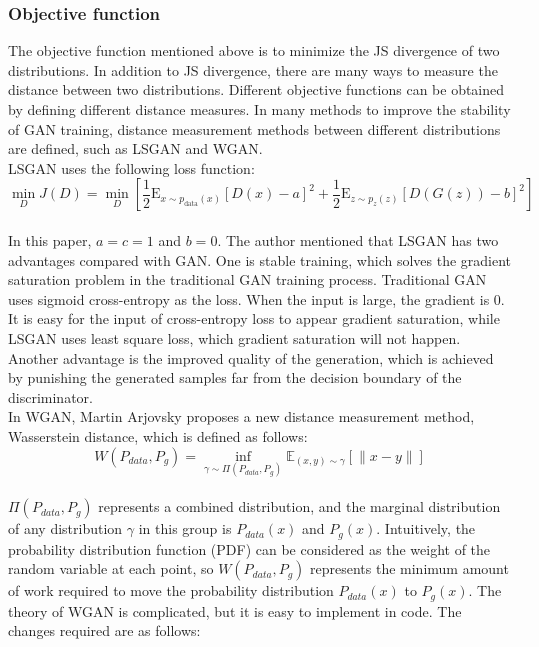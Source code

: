 \documentclass[11pt,a4paper]{article}
\begin{document}
\subsubsection{Objective function}
The objective function mentioned above is to minimize the JS divergence of two distributions. In addition to JS divergence, there are many ways to measure the distance between two distributions. Different objective functions can be obtained by defining different distance measures. In many methods to improve the stability of GAN training, distance measurement methods between different distributions are defined, such as LSGAN\citep{mao2017least} and WGAN\citep{arjovsky2017wasserstein}.
\\
\newline
LSGAN uses the following loss function:
\\
\newline
$$
\min _{D} J(D)=\min _{D}\left[\frac{1}{2} \mathrm{E}_{x \sim p_{\text {data}}(x)}[D(x)-a]^{2}+\frac{1}{2} \mathrm{E}_{z \sim p_{z}(z)}[D(G(z))-b]^{2}\right]
$$
\\
\newline
In this paper, $a=c=1$ and $b=0$. The author mentioned that LSGAN has two advantages compared with GAN. One is stable training, which solves the gradient saturation problem in the traditional GAN training process. Traditional GAN uses sigmoid cross-entropy as the loss\citep{goodfellow2014generative}. When the input is large, the gradient is 0. It is easy for the input of cross-entropy loss to appear gradient saturation, while LSGAN uses least square loss, which gradient saturation will not happen. Another advantage is the improved quality of the generation, which is achieved by punishing the generated samples far from the decision boundary of the discriminator\citep{mao2017least}.
\\
\newline
In WGAN, Martin Arjovsky proposes a new distance measurement method, Wasserstein distance, which is defined as follows:
\newline
$$
W\left(P_{data}, P_{g}\right)=\inf _{\gamma \sim \Pi\left(P_{data}, P_{g}\right)} \mathbb{E}_{(x, y) \sim \gamma}[\|x-y\|]
$$
\\
$\Pi\left(P_{data}, P_{g}\right)$ represents a combined distribution, and the marginal distribution of any distribution $\gamma$ in this group is $P_{data}(x)$ and $P_{g}(x)$. Intuitively, the probability distribution function (PDF) can be considered as the weight of the random variable at each point, so $W\left(P_{data}, P_{g}\right)$ represents the minimum amount of work required to move the probability distribution $P_{data} (x)$ to $P_{g} (x)$. The theory of WGAN is complicated, but it is easy to implement in code. The changes required are as follows:
\end{document}
